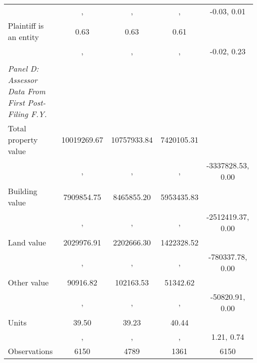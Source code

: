 \begin{table}[htbp]
\begin{tabular}{l*{4}{c}}
                    &          , &          , &          , & -0.03, 0.01\\
\hspace{0.25cm}Plaintiff is an entity&        0.63&        0.63&        0.61&            \\
                    &          , &          , &          , & -0.02, 0.23\\
\vspace{0.1em} \\ \emph{Panel D: Assessor Data From First Post-Filing F.Y.}&            &            &            &            \\
\hspace{0.25cm}Total property value& 10019269.67& 10757933.84&  7420105.31&            \\
                    &          , &          , &          , &-3337828.53, 0.00\\
\hspace{0.25cm}Building value&  7909854.75&  8465855.20&  5953435.83&            \\
                    &          , &          , &          , &-2512419.37, 0.00\\
\hspace{0.25cm}Land value&  2029976.91&  2202666.30&  1422328.52&            \\
                    &          , &          , &          , &-780337.78, 0.00\\
\hspace{0.25cm}Other value&    90916.82&   102163.53&    51342.62&            \\
                    &          , &          , &          , &-50820.91, 0.00\\
\hspace{0.25cm}Units&       39.50&       39.23&       40.44&            \\
                    &          , &          , &          , &  1.21, 0.74\\
\midrule
Observations        &        6150&        4789&        1361&        6150\\
\bottomrule
\end{tabular}
\end{table}
